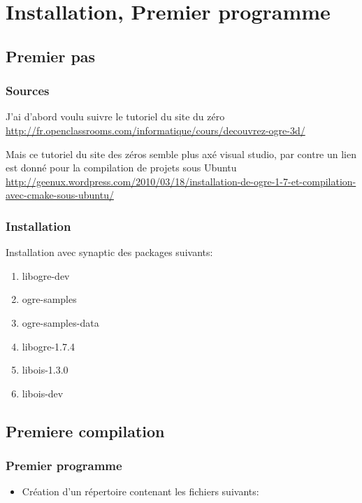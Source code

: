 
\chapter{Installation, Premier programme}

\section{Premier pas}
\subsection{Sources}
J'ai d'abord voulu suivre le tutoriel du site du z\'ero
\url{http://fr.openclassrooms.com/informatique/cours/decouvrez-ogre-3d/}\newline

Mais ce tutoriel du site des z\'eros semble plus ax\'e visual studio, par contre un lien est donn\'e pour la compilation de projets sous Ubuntu \url{http://geenux.wordpress.com/2010/03/18/installation-de-ogre-1-7-et-compilation-avec-cmake-sous-ubuntu/}


\subsection{Installation}
Installation avec synaptic des packages suivants:
\begin{enumerate}
\item libogre-dev
\item ogre-samples
\item ogre-samples-data
\item libogre-1.7.4
\item libois-1.3.0
\item libois-dev 
\end{enumerate}






\section{Premiere compilation}

\subsection{Premier programme}

\begin{itemize}
\item Cr\'eation d'un r\'epertoire contenant les fichiers suivants:
\end{itemize}

